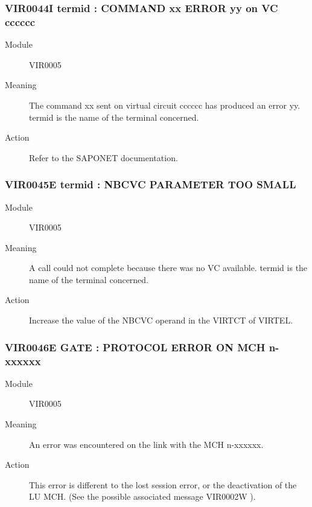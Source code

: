 \documentclass[letterpaper,10pt,english]{sphinxmanual}
\begin{document}
\subsubsection{VIR0044I termid : COMMAND xx ERROR yy on VC cccccc}
\label{\detokenize{messages:vir0044i-termid-command-xx-error-yy-on-vc-cccccc}}\begin{description}
\item[{Module}] \leavevmode
VIR0005

\item[{Meaning}] \leavevmode
The command xx sent on virtual circuit cccccc has produced an error yy. termid is the name of the terminal concerned.

\item[{Action}] \leavevmode
Refer to the SAPONET documentation.

\end{description}


\subsubsection{VIR0045E termid : NBCVC PARAMETER TOO SMALL}
\label{\detokenize{messages:vir0045e-termid-nbcvc-parameter-too-small}}\begin{description}
\item[{Module}] \leavevmode
VIR0005

\item[{Meaning}] \leavevmode
A call could not complete because there was no VC available. termid is the name of the terminal concerned.

\item[{Action}] \leavevmode
Increase the value of the NBCVC operand in the VIRTCT of VIRTEL.

\end{description}


\subsubsection{VIR0046E GATE : PROTOCOL ERROR ON MCH n-xxxxxx}
\label{\detokenize{messages:vir0046e-gate-protocol-error-on-mch-n-xxxxxx}}\begin{description}
\item[{Module}] \leavevmode
VIR0005

\item[{Meaning}] \leavevmode
An error was encountered on the link with the MCH n-xxxxxx.

\item[{Action}] \leavevmode
This error is different to the lost session error, or the deactivation of the LU MCH. (See the possible associated message VIR0002W ).

\end{description}
\end{document}
